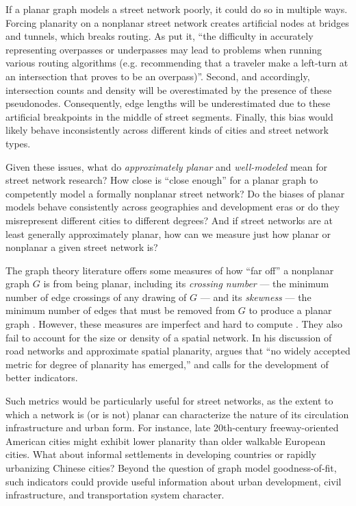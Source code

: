 \documentclass[Afour,sageh,times]{sagej}
\begin{document}
If a planar graph models a street network poorly, it could do so in multiple ways. Forcing planarity on a nonplanar street network creates artificial nodes at bridges and tunnels, which breaks routing. As \citet[p.~6]{kwan_review_1996} put it, \enquote{the difficulty in accurately representing overpasses or underpasses may lead to problems when running various routing algorithms (e.g. recommending that a traveler make a left-turn at an intersection that proves to be an overpass)}. Second, and accordingly, intersection counts and density will be overestimated by the presence of these pseudonodes. Consequently, edge lengths will be underestimated due to these artificial breakpoints in the middle of street segments. Finally, this bias would likely behave inconsistently across different kinds of cities and street network types.

Given these issues, what do \emph{approximately planar} and \emph{well-modeled} mean for street network research? How close is \enquote{close enough} for a planar graph to competently model a formally nonplanar street network? Do the biases of planar models behave consistently across geographies and development eras or do they misrepresent different cities to different degrees? And if street networks are at least generally approximately planar, how can we measure just how planar or nonplanar a given street network is?

The graph theory literature offers some measures of how \enquote{far off} a nonplanar graph $G$ is from being planar, including its \emph{crossing number} --- the minimum number of edge crossings of any drawing of $G$ --- and its \emph{skewness} --- the minimum number of edges that must be removed from $G$ to produce a planar graph \citep{liebers_planarizing_2001,szekely_successful_2004,chimani_non-planar_2009}. However, these measures are imperfect and hard to compute \citep{chimani_vertex_2012,szekely_successful_2004}. They also fail to account for the size or density of a spatial network. In his discussion of road networks and approximate spatial planarity, \citet[p.~133]{newman_networks:_2010} argues that \enquote{no widely accepted metric for degree of planarity has emerged,} and calls for the development of better indicators.

Such metrics would be particularly useful for street networks, as the extent to which a network is (or is not) planar can characterize the nature of its circulation infrastructure and urban form. For instance, late 20th-century freeway-oriented American cities might exhibit lower planarity than older walkable European cities. What about informal settlements in developing countries or rapidly urbanizing Chinese cities? Beyond the question of graph model goodness-of-fit, such indicators could provide useful information about urban development, civil infrastructure, and transportation system character.
\end{document}
